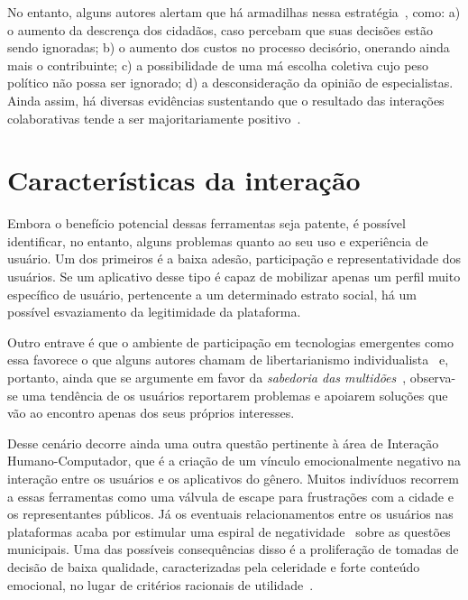 \documentclass{sigchi}
\begin{document}
No entanto, alguns autores alertam que há armadilhas nessa estratégia~\cite{irvin:2004, brabham:2009}, como: a) o aumento da descrença dos cidadãos, caso percebam que suas decisões estão sendo ignoradas; b) o aumento dos custos no processo decisório, onerando ainda mais o contribuinte; c) a possibilidade de uma má escolha coletiva cujo peso político não possa ser ignorado; d) a desconsideração da opinião de especialistas. Ainda assim, há diversas evidências sustentando que o resultado das interações colaborativas tende a ser majoritariamente positivo~\cite{schuurman:2012}.

\section{Características da interação}
Embora o benefício potencial dessas ferramentas seja patente, é possível identificar, no entanto, alguns problemas quanto ao seu uso e experiência de usuário. Um dos primeiros é a baixa adesão, participação e representatividade dos usuários. Se um aplicativo desse tipo é capaz de mobilizar apenas um perfil muito específico de usuário, pertencente a um determinado estrato social, há um possível esvaziamento da legitimidade da plataforma.

Outro entrave é que o ambiente de participação em tecnologias emergentes como essa favorece o que alguns autores chamam de libertarianismo individualista~\cite{brabham:2008} e, portanto, ainda que se argumente em favor da \textit{sabedoria das multidões}~\cite{surowiecki:2005}, observa-se uma tendência de os usuários reportarem problemas e apoiarem soluções que vão ao encontro apenas dos seus próprios interesses.

Desse cenário decorre ainda uma outra questão pertinente à área de Interação Humano-Computador, que é a criação de um vínculo emocionalmente negativo na interação entre os usuários e os aplicativos do gênero. Muitos indivíduos recorrem a essas ferramentas como uma válvula de escape para frustrações com a cidade e os representantes públicos. Já os eventuais relacionamentos entre os usuários nas plataformas acaba por estimular uma espiral de negatividade~\cite{slater:2007} sobre as questões municipais. Uma das possíveis consequências disso é a proliferação de tomadas de decisão de baixa qualidade, caracterizadas pela celeridade e forte conteúdo emocional, no lugar de critérios racionais de utilidade~\cite{tversky:1986}.
\end{document}
